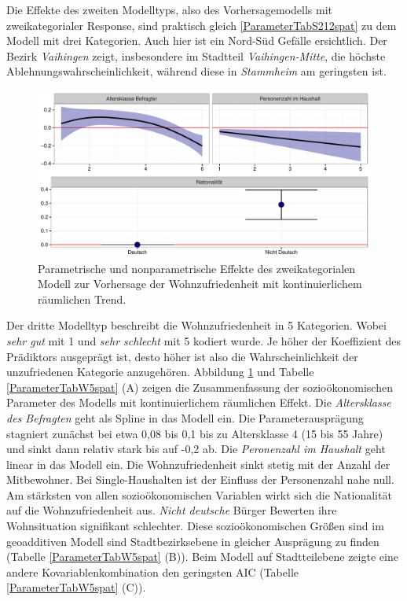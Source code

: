 \documentclass{Vorlage}
\begin{document}
Die Effekte des zweiten Modelltyps, also des Vorhersagemodells mit zweikategorialer Response, sind praktisch gleich \ref{ParameterTabS212spat} zu dem Modell mit drei Kategorien. Auch hier ist ein Nord-Süd Gefälle ersichtlich. Der Bezirk \textit{Vaihingen} zeigt, insbesondere im Stadtteil \textit{Vaihingen-Mitte}, die höchste Ablehnungswahrscheinlichkeit, während diese in \textit{Stammheim} am geringsten ist.\\
\begin{figure}[h]
 \begin{center}
 \includegraphics[scale=0.8]{Pictures/BWModelEffects2}
 \caption{Parametrische und nonparametrische Effekte des zweikategorialen Modell zur Vorhersage der Wohnzufriedenheit mit kontinuierlichem räumlichen Trend.}
 \label{BWParam}
 \end{center}
\end{figure}
Der dritte Modelltyp beschreibt die Wohnzufriedenheit in 5 Kategorien. Wobei \textit{sehr gut} mit 1 und \textit{sehr schlecht} mit 5 kodiert wurde. Je höher der Koeffizient des Prädiktors ausgeprägt ist, desto höher ist also die Wahrscheinlichkeit der unzufriedenen Kategorie anzugehören. Abbildung \ref{BWParam} und Tabelle \ref{ParameterTabW5spat} (A) zeigen die Zusammenfassung der sozioökonomischen Parameter des Modells mit kontinuierlichem räumlichen Effekt. Die \textit{Altersklasse des Befragten} geht als Spline in das Modell ein. Die Parameterausprägung stagniert zunächst bei etwa 0,08 bis 0,1 bis zu Altersklasse 4 (15 bis 55 Jahre) und sinkt dann relativ stark bis auf -0,2 ab. Die \textit{Peronenzahl im Haushalt} geht linear in das Modell ein. Die Wohnzufriedenheit sinkt stetig mit der Anzahl der Mitbewohner. Bei Single-Haushalten ist der Einfluss der Personenzahl nahe null. Am stärksten von allen sozioökonomischen Variablen wirkt sich die Nationalität auf die Wohnzufriedenheit aus. \textit{Nicht deutsche} Bürger Bewerten ihre Wohnsituation signifikant schlechter. Diese  sozioökonomischen Größen sind im geoadditiven Modell sind Stadtbezirksebene in gleicher Ausprägung zu finden (Tabelle \ref{ParameterTabW5spat} (B)). Beim Modell auf Stadtteilebene zeigte eine andere Kovariablenkombination den geringsten AIC (Tabelle \ref{ParameterTabW5spat} (C)).\\
\end{document}

